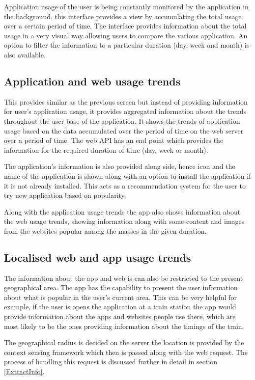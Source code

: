 \documentclass[12pt]{report}
\begin{document}
Application usage of the user is being constantly monitored by the application in the background, this interface provides a view by accumulating the total usage over a certain period of time. The interface provides information about the total usage in a very visual way allowing users to compare the various application. An option to filter the information to a particular duration (day, week and month) is also available.

\subsection{Application and web usage trends}

This provides similar as the previous screen but instead of providing information for user's application usage, it provides aggregated information about the trends throughout the user-base of the application. It shows the trends of application usage based on the data accumulated over the period of time on the web server over a period of time. The web API has an end point which provides the information for the required duration of time (day, week or month).

The application's information is also provided along side, hence icon and the name of the application is shown along with an option to install the application if it is not already installed. This acts as a recommendation system for the user to try new application based on popularity.

Along with the application usage trends the app also shows information about the web usage trends, showing information along with some content and images from the websites popular among the masses in the given duration.


\subsection{Localised web and app usage trends}

The information about the app and web is can also be restricted to the present geographical area. The app has the capability to present the user information about what is popular in the user's current area. This can be very helpful for example, if the user is opens the application at a train station the app would provide information about the apps and websites people use there, which are most likely to be the ones providing information about the timings of the train.

The geographical radius is decided on the server the location is provided by the context sensing framework which then is passed along with the web request. The process of handling this request is discussed further in detail in section \ref{ExtractInfo}.
\end{document}
